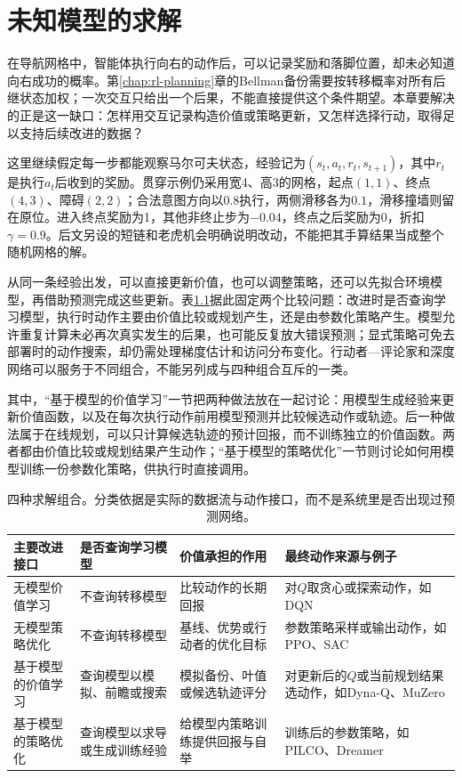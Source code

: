 \chapter{未知模型的求解}
\label{chap:rl-learning}

在导航网格中，智能体执行向右的动作后，可以记录奖励和落脚位置，却未必知道向右成功的概率。第\ref{chap:rl-planning}章的Bellman备份需要按转移概率对所有后继状态加权；一次交互只给出一个后果，不能直接提供这个条件期望。本章要解决的正是这一缺口：怎样用交互记录构造价值或策略更新，又怎样选择行动，取得足以支持后续改进的数据？

这里继续假定每一步都能观察马尔可夫状态，经验记为$(s_t,a_t,r_t,s_{t+1})$，其中$r_t$是执行$a_t$后收到的奖励。贯穿示例仍采用宽4、高3的网格，起点$(1,1)$、终点$(4,3)$、障碍$(2,2)$；合法意图方向以$0.8$执行，两侧滑移各为$0.1$，滑移撞墙则留在原位。进入终点奖励为1，其他非终止步为$-0.04$，终点之后奖励为0，折扣$\gamma=0.9$。后文另设的短链和老虎机会明确说明改动，不能把其手算结果当成整个随机网格的解。

从同一条经验出发，可以直接更新价值，也可以调整策略，还可以先拟合环境模型，再借助预测完成这些更新。表\ref{tab:rl-learning-four-interfaces}据此固定两个比较问题：改进时是否查询学习模型，执行时动作主要由价值比较或规划产生，还是由参数化策略产生。模型允许重复计算未必再次真实发生的后果，也可能反复放大错误预测；显式策略可免去部署时的动作搜索，却仍需处理梯度估计和访问分布变化。行动者—评论家和深度网络可以服务于不同组合，不能另列成与四种组合互斥的一类。

其中，“基于模型的价值学习”一节把两种做法放在一起讨论：用模型生成经验来更新价值函数，以及在每次执行动作前用模型预测并比较候选动作或轨迹。后一种做法属于在线规划，可以只计算候选轨迹的预计回报，而不训练独立的价值函数。两者都由价值比较或规划结果产生动作；“基于模型的策略优化”一节则讨论如何用模型训练一份参数化策略，供执行时直接调用。

\begin{table}[t]
  \centering
  \small
  \begin{tabularx}{\linewidth}{>{\raggedright\arraybackslash}p{26mm} >{\raggedright\arraybackslash}X >{\raggedright\arraybackslash}X >{\raggedright\arraybackslash}X}
    \toprule
    主要改进接口 & 是否查询学习模型 & 价值承担的作用 & 最终动作来源与例子 \\
    \midrule
    无模型价值学习 & 不查询转移模型 & 比较动作的长期回报 & 对$Q$取贪心或探索动作，如DQN \\
    无模型策略优化 & 不查询转移模型 & 基线、优势或行动者的优化目标 & 参数策略采样或输出动作，如PPO、SAC \\
    基于模型的价值学习 & 查询模型以模拟、前瞻或搜索 & 模拟备份、叶值或候选轨迹评分 & 对更新后的$Q$或当前规划结果选动作，如Dyna-Q、MuZero \\
    基于模型的策略优化 & 查询模型以求导或生成训练经验 & 给模型内策略训练提供回报与自举 & 训练后的参数策略，如PILCO、Dreamer \\
    \bottomrule
  \end{tabularx}
  \caption{四种求解组合。分类依据是实际的数据流与动作接口，而不是系统里是否出现过预测网络。}
  \label{tab:rl-learning-four-interfaces}
\end{table}

